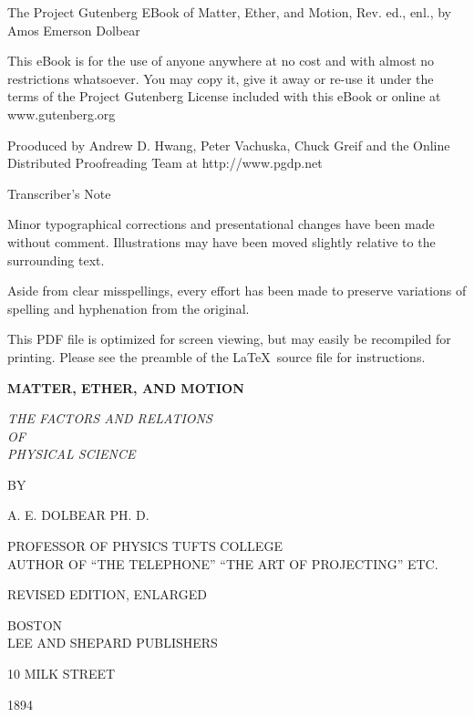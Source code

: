 \documentclass[oneside,12pt]{book}
\begin{document}
    
\frontmatter

\noindent The Project Gutenberg EBook of Matter, Ether, and Motion, Rev. ed., enl., by Amos Emerson Dolbear \par 

\noindent This eBook is for the use of anyone anywhere at no cost and with almost no restrictions whatsoever. You may copy it, give it away or re-use it under the terms
of the Project Gutenberg License included with this eBook or online at www.gutenberg.org \par 

\pagebreak

\noindent Prooduced by Andrew D. Hwang, Peter Vachuska, Chuck Greif and the Online Distributed Proofreading Team at http://www.pgdp.net \par 

\vfill

\begin{center}
    Transcriber's Note
\end{center}
Minor typographical corrections and presentational changes have been made without comment. Illustrations may have been moved slightly relative to the surrounding text. \par 

\noindent Aside from clear misspellings, every effort has been made to preserve variations of spelling and hyphenation from the original. \par 

\noindent This PDF file is optimized for screen viewing, but may easily be recompiled for printing. Please see the preamble of the \LaTeX\ source file for instructions. \par 
\begin{titlepage}
    \centering
    {\Huge \textbf{MATTER, ETHER, AND MOTION} \par}
    \vspace{2cm}
    {\LARGE \textit{THE FACTORS AND RELATIONS\\OF\\PHYSICAL SCIENCE} \par}
    \vspace{2cm}
    {\normalsize BY \par}
    {\Large A. E. DOLBEAR PH. D. \par}
    {\tiny PROFESSOR OF PHYSICS TUFTS COLLEGE\\AUTHOR OF ``THE TELEPHONE'' ``THE ART OF PROJECTING'' ETC. \par}
    \vspace{2cm}
    {\small REVISED EDITION, ENLARGED \par}
    \vfill
    {\large BOSTON\\LEE AND SHEPARD PUBLISHERS \par}
    {\small 10 MILK STREET \par} 
    {\large 1894 \par}
\end{titlepage}
\end{document}
